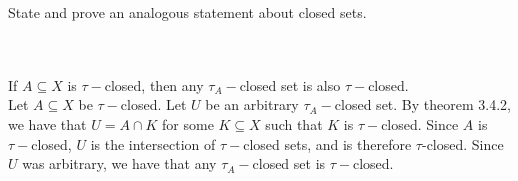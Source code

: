 State and prove an analogous statement about closed sets.\\\\

\begin{solution}\renewcommand{\qedsymbol}{}\ \\
    If $A\subseteq X$ is $\tau-$closed, then any $\tau_{A}-$closed set is also $\tau-$closed.\\

    Let $A\subseteq X$ be $\tau-$closed. Let $U$ be an arbitrary $\tau_{A}-$closed set. By
    theorem 3.4.2, we have that $U=A\cap K$ for some $K\subseteq X$ such that $K$ is $\tau-$closed.
    Since $A$ is $\tau-$closed, $U$ is the intersection of $\tau-$closed sets, and is therefore
    $\tau$-closed. Since $U$ was arbitrary, we have that any $\tau_{A}-$closed set is $\tau-$closed.


\end{solution}